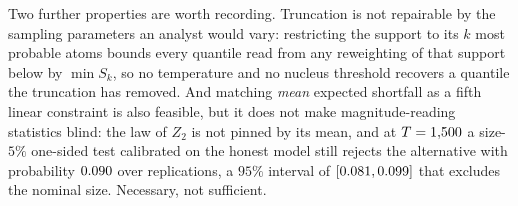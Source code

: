 \documentclass[preprint,11pt,authoryear]{elsarticle}
\newcommand{\1}{\boldsymbol{1}}
\begin{document}
Two further properties are worth recording. Truncation is not repairable by the
sampling parameters an analyst would vary: restricting the support to its $k$
most probable atoms bounds every quantile read from any reweighting of that
support below by $\min S_k$, so no temperature and no nucleus threshold recovers
a quantile the truncation has removed. And matching \emph{mean} expected
shortfall as a fifth linear constraint is also feasible, but it does not make
magnitude-reading statistics blind: the law of $Z_2$ is not pinned by its mean,
and at $T = 1{,}500$ a size-$5\%$ one-sided test calibrated on the honest
model still rejects the alternative with probability $0.090$ over
\nSupPowerReps{} replications, a $95\%$ interval of $[0.081,
0.099]$ that excludes the nominal size. Necessary, not
sufficient.





\end{document}
